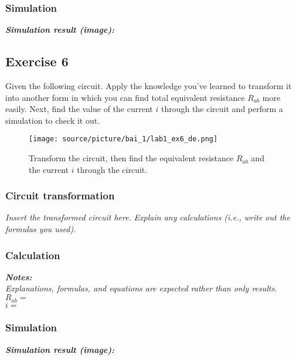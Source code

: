 \subsubsection{Simulation}
\textit{\textbf{Simulation result (image):}}
\newpage
\newpage

\subsection{Exercise 6}
Given the following circuit. Apply the knowledge you've learned to transform it into another form in which you can find total equivalent resistance $R_{ab}$ more easily. Next, find the value of the current $i$ through the circuit and perform a simulation to check it out.

\begin{figure}[H]
    \centering
    \texttt{[image: source/picture/bai\_1/lab1\_ex6\_de.png]}
    \caption{Transform the circuit, then find the equivalent resistance $R_{ab}$ and the current $i$ through the circuit.} 
    \label{lab1_ex6_de}
\end{figure}

\subsubsection{Circuit transformation}
\textit{Insert the transformed circuit here.}
\newpage
\textit{Explain any calculations (i.e., write out the formulas you used).}\\
\dotfill\bigskip\par\mbox{}\dotfill
\dotfill\bigskip\par\mbox{}\dotfill
\dotfill\bigskip\par\mbox{}\dotfill
\dotfill\bigskip\par\mbox{}\dotfill
\dotfill\bigskip\par\mbox{}\dotfill

\subsubsection{Calculation}
\textit{\textbf{Notes:}}\\
\textit{Explanations, formulas, and equations are expected rather than only results.}\bigskip\\
$R_{ab} = $\dotfill\bigskip\\
$i =$\dotfill\bigskip

\subsubsection{Simulation}
\textit{\textbf{Simulation result (image):}}
\newpage

